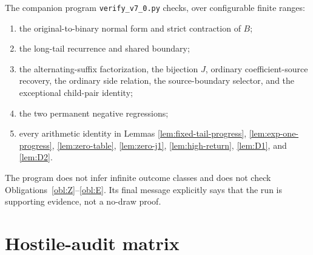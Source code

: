 \documentclass[11pt,a4paper]{article}
\theoremstyle{definition}
\theoremstyle{remark}
\begin{document}
The companion program \texttt{verify\_v7\_0.py} checks, over configurable
finite ranges:
\begin{enumerate}[label=(\arabic*)]
\item the original-to-binary normal form and strict contraction of $B$;
\item the long-tail recurrence and shared boundary;
\item the alternating-suffix factorization, the bijection $J$, ordinary
      coefficient-source recovery, the ordinary side relation, the
      source-boundary selector, and the exceptional child-pair identity;
\item the two permanent negative regressions;
\item every arithmetic identity in Lemmas
      \ref{lem:fixed-tail-progress}, \ref{lem:exp-one-progress},
      \ref{lem:zero-table}, \ref{lem:zero-j1},
      \ref{lem:high-return}, \ref{lem:D1}, and \ref{lem:D2}.
\end{enumerate}
The program does not infer infinite outcome classes and does not check
Obligations~\ref{obl:Z}--\ref{obl:E}.  Its final message explicitly says
that the run is supporting evidence, not a no-draw proof.

\section{Hostile-audit matrix}
\end{document}
